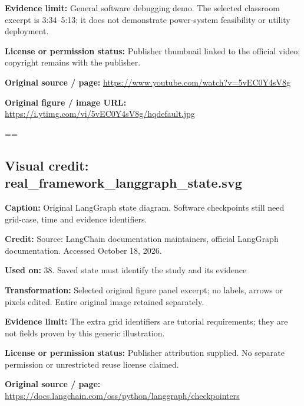 \documentclass[10pt,letterpaper]{article}
\begin{document}
\textbf{Evidence limit:} General software debugging demo. The selected classroom excerpt is 3:34--5:13; it does not demonstrate power-system feasibility or utility deployment.\par
\textbf{License or permission status:} Publisher thumbnail linked to the official video; copyright remains with the publisher.\par
\textbf{Original source / page:} \href{https://www.youtube.com/watch?v=5vEC0Y4sV8g}{\small\ttfamily https:/\allowbreak{}/\allowbreak{}www.\allowbreak{}youtube.\allowbreak{}com/\allowbreak{}watch?\allowbreak{}v=\allowbreak{}5vEC0Y4sV8g}\par
\textbf{Original figure / image URL:} \href{https://i.ytimg.com/vi/5vEC0Y4sV8g/hqdefault.jpg}{\small\ttfamily https:/\allowbreak{}/\allowbreak{}i.\allowbreak{}ytimg.\allowbreak{}com/\allowbreak{}vi/\allowbreak{}5vEC0Y4sV8g/\allowbreak{}hqdefault.\allowbreak{}jpg}\par
\egroup\par\noindent\box\readingEntry\par\medskip
\setbox\readingEntry=\vbox\bgroup\hsize=\linewidth\subsection*{Visual credit: real\_framework\_langgraph\_state.svg}
\textbf{Caption:} Original LangGraph state diagram. Software checkpoints still need grid-case, time and evidence identifiers.\par
\textbf{Credit:} Source: LangChain documentation maintainers, official LangGraph documentation. Accessed October 18, 2026.\par
\textbf{Used on:} 38. Saved state must identify the study and its evidence\par
\textbf{Transformation:} Selected original figure panel excerpt; no labels, arrows or pixels edited. Entire original image retained separately.\par
\textbf{Evidence limit:} The extra grid identifiers are tutorial requirements; they are not fields proven by this generic illustration.\par
\textbf{License or permission status:} Publisher attribution supplied. No separate permission or unrestricted reuse license claimed.\par
\textbf{Original source / page:} \href{https://docs.langchain.com/oss/python/langgraph/checkpointers}{\small\ttfamily https:/\allowbreak{}/\allowbreak{}docs.\allowbreak{}langchain.\allowbreak{}com/\allowbreak{}oss/\allowbreak{}python/\allowbreak{}langgraph/\allowbreak{}checkpointers}\par
\end{document}
